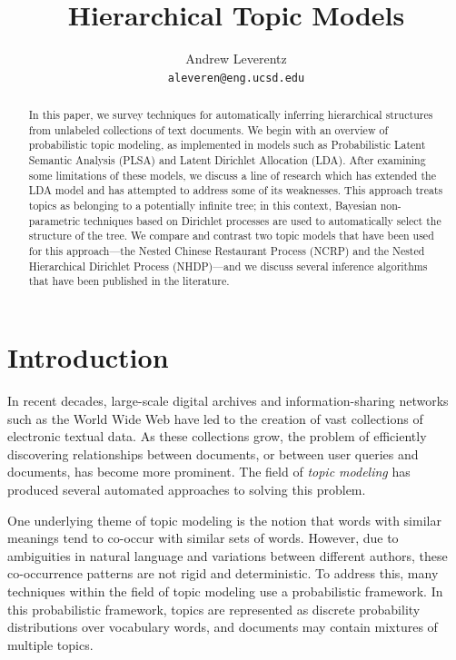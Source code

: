 \documentclass{article}
\title{Hierarchical Topic Models}
\author{
  Andrew Leverentz \\
  \texttt{aleveren@eng.ucsd.edu} \\
}
\begin{document}
\maketitle

\begin{abstract}
In this paper, we survey techniques for automatically inferring hierarchical structures from unlabeled collections of text documents.
We begin with an overview of probabilistic topic modeling, as implemented in models such as Probabilistic Latent Semantic Analysis (PLSA) and Latent Dirichlet Allocation (LDA).
After examining some limitations of these models, we discuss a line of research which has extended the LDA model and has attempted to address some of its weaknesses.
This approach treats topics as belonging to a potentially infinite tree; in this context, Bayesian non-parametric techniques based on Dirichlet processes are used to automatically select the structure of the tree.
We compare and contrast two topic models that have been used for this approach---the Nested Chinese Restaurant Process (NCRP) and the Nested Hierarchical Dirichlet Process (NHDP)---and we discuss several inference algorithms that have been published in the literature.
\end{abstract}

\section{Introduction}

In recent decades, large-scale digital archives and information-sharing networks such as the World Wide Web have led to the creation of vast collections of electronic textual data.
As these collections grow, the problem of efficiently discovering relationships between documents, or between  user queries and documents, has become more prominent.
The field of \emph{topic modeling} has produced several automated approaches to solving this problem.

One underlying theme of topic modeling is the notion that words with similar meanings tend to co-occur with similar sets of words.
However, due to ambiguities in natural language and variations between different authors, these co-occurrence patterns are not rigid and deterministic.
To address this, many techniques within the field of topic modeling use a probabilistic framework.
In this probabilistic framework, topics are represented as discrete probability distributions over vocabulary words, and documents may contain mixtures of multiple topics.
\end{document}
